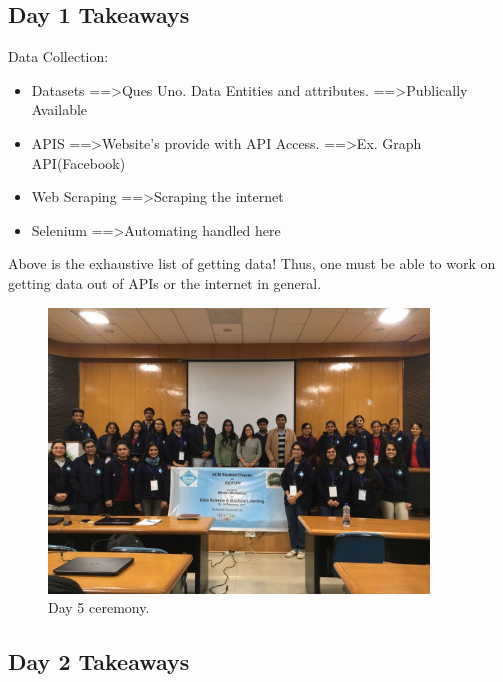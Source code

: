 \documentclass[a4paper]{article}
\begin{document}
\subsection{Day 1 Takeaways }

Data Collection:
	
\begin{itemize}
\item Datasets\newline
 		==>Ques Uno. Data Entities and attributes.\newline
 		==>Publically Available\newline
\item 	APIS\newline
		==>Website's provide with API Access.\newline
 		==>Ex. Graph API(Facebook)\newline
\item 	Web Scraping\newline
 		==>Scraping the internet\newline
\item 	Selenium\newline
		==>Automating handled here
\end{itemize}
Above is the exhaustive list of getting data!
Thus, one must be able to work on getting data out of APIs or the internet in general.

\begin{figure}
\centering
\includegraphics[width=0.9\textwidth]{ACM_Winter_Workshop_group_photo.jpg}
\caption{\label{fig:acm}Day 5 ceremony.}
\end{figure}
\subsection{Day 2 Takeaways }
\end{document}
